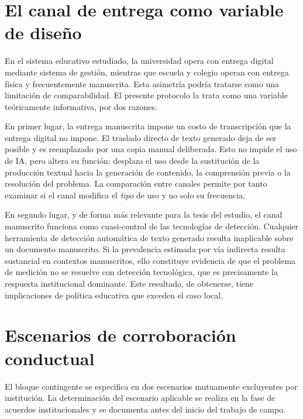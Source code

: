 \documentclass[11pt,a4paper]{article}
\begin{document}
\section{El canal de entrega como variable de diseño}
\label{sec:canal}

En el sistema educativo estudiado, la universidad opera con entrega digital mediante sistema de gestión, mientras que escuela y colegio operan con entrega física y frecuentemente manuscrita. Esta asimetría podría tratarse como una limitación de comparabilidad. El presente protocolo la trata como una variable teóricamente informativa, por dos razones.

En primer lugar, la entrega manuscrita impone un costo de transcripción que la entrega digital no impone. El traslado directo de texto generado deja de ser posible y es reemplazado por una copia manual deliberada. Esto no impide el uso de IA, pero altera su función: desplaza el uso desde la sustitución de la producción textual hacia la generación de contenido, la comprensión previa o la resolución del problema. La comparación entre canales permite por tanto examinar si el canal modifica el \emph{tipo} de uso y no solo su frecuencia.

En segundo lugar, y de forma más relevante para la tesis del estudio, el canal manuscrito funciona como cuasi-control de las tecnologías de detección. Cualquier herramienta de detección automática de texto generado resulta inaplicable sobre un documento manuscrito. Si la prevalencia estimada por vía indirecta resulta sustancial en contextos manuscritos, ello constituye evidencia de que el problema de medición no se resuelve con detección tecnológica, que es precisamente la respuesta institucional dominante. Este resultado, de obtenerse, tiene implicaciones de política educativa que exceden el caso local.

\section{Escenarios de corroboración conductual}
\label{sec:escenarios}

El bloque contingente se especifica en dos escenarios mutuamente excluyentes por institución. La determinación del escenario aplicable se realiza en la fase de acuerdos institucionales y se documenta antes del inicio del trabajo de campo.
\end{document}
